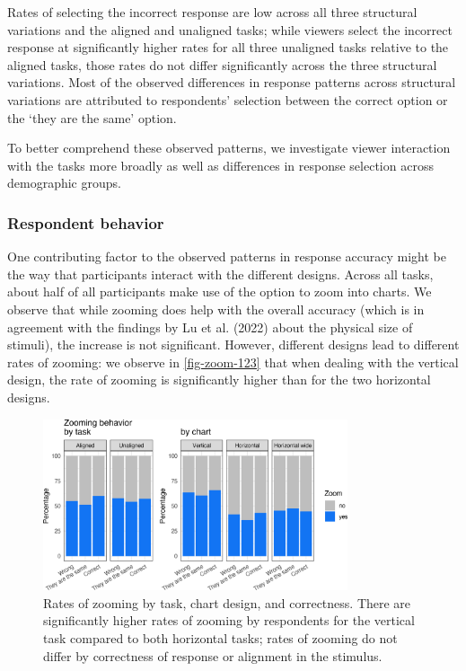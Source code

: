 \documentclass[
]{jds}
\begin{document}
Rates of selecting the incorrect response are low across all three
structural variations and the aligned and unaligned tasks; while viewers
select the incorrect response at significantly higher rates for all
three unaligned tasks relative to the aligned tasks, those rates do not
differ significantly across the three structural variations. Most of the
observed differences in response patterns across structural variations
are attributed to respondents' selection between the correct option or
the `they are the same' option.

To better comprehend these observed patterns, we investigate viewer
interaction with the tasks more broadly as well as differences in
response selection across demographic groups.

\hypertarget{respondent-behavior}{%
\subsubsection{Respondent behavior}\label{respondent-behavior}}

One contributing factor to the observed patterns in response accuracy
might be the way that participants interact with the different designs.
Across all tasks, about half of all participants make use of the option
to zoom into charts. We observe that while zooming does help with the
overall accuracy (which is in agreement with the findings by Lu et al.
(2022) about the physical size of stimuli), the increase is not
significant. However, different designs lead to different rates of
zooming: we observe in \autoref{fig-zoom-123} that when dealing with the
vertical design, the rate of zooming is significantly higher than for
the two horizontal designs.

\begin{figure}[hbt]

{\centering \includegraphics[width=0.8\textwidth,height=\textheight]{./figures/fig-zoom-123-1.png}

}

\caption{\label{fig-zoom-123}Rates of zooming by task, chart design, and
correctness. There are significantly higher rates of zooming by
respondents for the vertical task compared to both horizontal tasks;
rates of zooming do not differ by correctness of response or alignment
in the stimulus.}

\end{figure}
\end{document}
